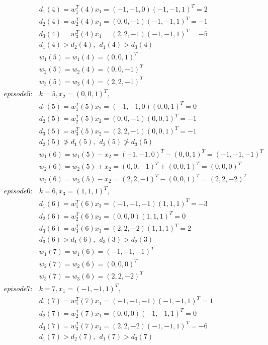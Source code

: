 \documentclass[a4paper, UTF8, 12pt]{ctexart}
\begin{document}
\begin{align*}
            &d_1(4)=w_1^T(4)x_1=(-1,-1,0)(-1,-1,1)^T=2 \\
            &d_2(4)=w_2^T(4)x_1=(0,0,-1)(-1,-1,1)^T=-1 \\
            &d_3(4)=w_3^T(4)x_1=(2,2,-1)(-1,-1,1)^T=-5 \\
            & d_1(4) > d_2(4) ,\ \  d_1(4) > d_3(4) \\
            &w_1(5)=w_1(4)=(0,0,1)^T \\
            &w_2(5)=w_2(4)=(0,0,-1)^T \\
            &w_3(5)=w_3(4)=(2,2,-1)^T \\
          episode5: &k=5,x_2 = {\left(0,0,1\right)}^T ,\\
            &d_1(5)=w_1^T(5)x_2=(-1,-1,0)(0,0,1)^T=0 \\
            &d_2(5)=w_2^T(5)x_2=(0,0,-1)(0,0,1)^T=-1 \\
            &d_3(5)=w_3^T(5)x_2=(2,2,-1)(0,0,1)^T=-1 \\
            & d_2(5) \not> d_1(5) ,\ \  d_2(5) \not> d_3(5) \\
            &w_1(6)=w_1(5)-x_2=(-1,-1,0)^T-(0,0,1)^T=(-1,-1,-1)^T \\
            &w_2(6)=w_2(5)+x_2=(0,0,-1)^T+(0,0,1)^T=(0,0,0)^T \\
            &w_3(6)=w_3(5)-x_2=(2,2,-1)^T-(0,0,1)^T=(2,2,-2)^T \\
          episode6 : &k=6,x_3= {\left(1,1,1 \right)}^T ,\\
            &d_1(6)=w_1^T(6)x_3=(-1,-1,-1)(1,1,1)^T= -3\\
            &d_2(6)=w_2^T(6)x_3=(0,0,0)(1,1,1)^T= 0 \\
            &d_3(6)=w_3^T(6)x_3=(2,2,-2)(1,1,1)^T= 2 \\
            & d_3(6) > d_1(6) ,\ \  d_3(3) > d_2(3) \\
            &w_1(7)=w_1(6)=(-1,-1,-1)^T \\
            &w_2(7)=w_2(6)=(0,0,0)^T \\
            &w_3(7)=w_3(6)=(2,2,-2)^T\\
          episode7: &k=7,x_1 = {\left(-1,-1,1\right)}^T ,\\
            &d_1(7)=w_1^T(7)x_1=(-1,-1,-1)(-1,-1,1)^T=1 \\
            &d_2(7)=w_2^T(7)x_1=(0,0,0)(-1,-1,1)^T=0 \\
            &d_3(7)=w_3^T(7)x_1=(2,2,-2)(-1,-1,1)^T=-6 \\
            & d_1(7) > d_2(7) ,\ \  d_1(7) > d_3(7) \\

\end{align*}
\end{document}
